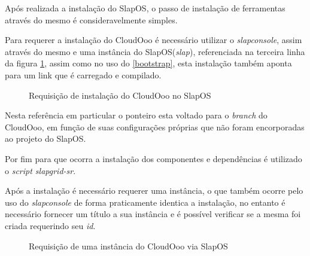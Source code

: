 Após realizada a instalação do SlapOS, o passo de instalação de ferramentas através do mesmo é consideravelmente simples.

Para requerer a instalação do CloudOoo é necessário utilizar o \textit{slapconsole}, assim através do mesmo e uma instância do SlapOS(\textit{slap}), referenciada na terceira linha da figura \ref{requisicao-software}, assim como no uso do \ref{bootstrap}, esta instalação também aponta para um link que é carregado e compilado.

\begin{figure}[ht]
    \centering
    \caption{Requisição de instalação do CloudOoo no SlapOS}
    \label{requisicao-software}
\end{figure}

Nesta referência em particular o ponteiro esta voltado para o \textit{branch} do CloudOoo, em função de suas configurações próprias que não foram encorporadas ao projeto do SlapOS.

Por fim para que ocorra a instalação dos componentes e dependências é utilizado o \textit{script slapgrid-sr}.

Após a instalação é necessário requerer uma instância, o que também ocorre pelo uso do \textit{slapconsole} de forma praticamente identica a instalação, no entanto é necessário fornecer um título a sua instância e é possível verificar se a mesma foi criada requerindo seu \textit{id}.

\begin{figure}[ht]
    \centering
    \caption{Requisição de uma instância do CloudOoo via SlapOS}
    \label{requisicao-instancia}
\end{figure}


